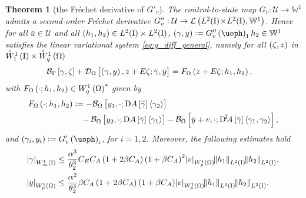 \documentclass[final]{siamltex}
\newtheorem{thm}[theorem]{Theorem}
\begin{document}
\begin{thm}[the Fr\'echet derivative of $G'_v$] \label{thm:g_twice_diff_u} 
	The control-to-state map $G_v:{\mathcal{U}}\to{\mathbb{W}}^1$ 
admits a second-order Fr\'echet derivative  
$G_v'' : {\mathcal{U}} \rightarrow \mathcal{L}\del{L^2({\text{\rm I}})\!\times\!
  L^2({\text{\rm I}}),{\mathbb{W}}^1}$. Hence for all ${\bar{u}} \in {\mathcal{U}}$ and all
$\del{h_1 , h_2} \in L^2({\text{\rm I}}) \times L^2({\text{\rm I}})$, $\del{\gamma, y} :=
G''_v\del\uoph_1h_2 \in {\mathbb{W}}^1$ satisfies the linear variational
system \eqref{eq:g_diff_general}, namely for
all $\del{\zeta,z}$ in ${{\mathring{W}^{1}_{1}\del{{\text{\rm I}}}}} \times {{\mathring{W}^{1}_{q}\del{\Omega}}}$
	\begin{align} \label{eq:g_nd_diff}
		 {{\mathcal{B}}_\Gamma}\sbr{\gamma,\zeta} + {{\mathcal{D}}_\Omega}\sbr{\del{\gamma,y},z+E\zeta;{\bar{\gamma}}, {\bar{y}}} 
			&= F_\Omega\del{z+E\zeta;h_1,h_2},
	\end{align}
with $F_\Omega\del{\cdot;h_1,h_2} \in {{W^{1}_{q}\del{\Omega}}}^*$ given by 
	\begin{equation}\begin{aligned} \label{eq:F_Omega}
		F_\Omega\del{\cdot;h_1,h_2}
			&:= -{{\mathcal{B}}_\Omega}\sbr{y_1,\cdot;\Dif A\sbr{\bar{\gamma}}{\langle {\gamma_2} \rangle}}  \\
			&\quad -{{\mathcal{B}}_\Omega}\sbr{y_2, \cdot; \Dif A\sbr{\bar{\gamma}}{\langle {\gamma_1} \rangle}} 
			       -{{\mathcal{B}}_\Omega}\sbr{{\bar{y}} + v,\cdot;\Dif^2 \!\!  A\sbr{\bar{\gamma}}{\langle {\gamma_1,\gamma_2} \rangle}}, 
	\end{aligned}\end{equation}
and $\del{\gamma_i, y_i} := G_v'\del\uoph_i$, for $i=1,2$. Moreover, the following estimates hold 
	\begin{align}
		\label{eq:g_nd_diff_estimate_gamma}
		{\abs{{\gamma}}_{{W^{{1}}_{{\infty}}\del{{\text{\rm I}}}}}} 
			&\leq \frac{\alpha^3}{\theta_2^3} C_E C_A\del{1+2\beta C_A}\del{1+\beta C_A}^2{\abs{{v}}_{{W^{{1}}_{{p}}\del{{\Omega}}}}} {\norm{{h_1}}_{{L^2\del{{{\text{\rm I}}}}}}}{\norm{{h_2}}_{{L^2\del{{{\text{\rm I}}}}}}},  \\
		\label{eq:g_nd_diff_estimate_y}
		{\abs{{y}}_{{W^{{1}}_{{p}}\del{{\Omega}}}}}
			&\leq \frac{\alpha^2}{\theta_2^3}\beta C_A\del{1+2\beta C_A}\del{1+\beta C_A}{\abs{{v}}_{{W^{{1}}_{{p}}\del{{\Omega}}}}}
				{\norm{{h_1}}_{{L^2\del{{{\text{\rm I}}}}}}}{\norm{{h_2}}_{{L^2\del{{{\text{\rm I}}}}}}}. 
	\end{align}
\end{thm}
\end{document}
